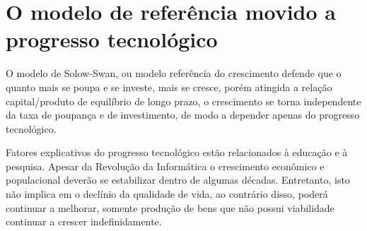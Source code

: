 \section{O modelo de referência movido a progresso tecnológico}

O modelo de Solow-Swan, ou modelo referência do crescimento defende que o quanto mais 
se poupa e se investe, mais se cresce, porém 
atingida a relação capital/produto de equilíbrio de longo prazo, o crescimento se torna independente da taxa de poupança e de investimento, de modo a depender apenas do progresso tecnológico.

Fatores explicativos do progresso tecnológico estão relacionados à educação e à pesquisa. 
Apesar da Revolução da Informática o crescimento econômico e populacional deverão se estabilizar dentro de algumas décadas.
Entretanto, isto não implica em o declínio da qualidade de vida, ao contrário disso, poderá continuar a melhorar, somente produção de bens que não possui viabilidade continuar a crescer indefinidamente.
